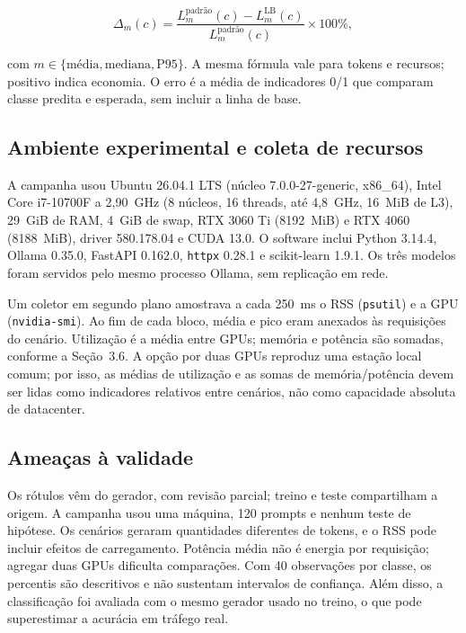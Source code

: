 \documentclass[12pt]{article}
\begin{document}
\begin{equation}
\Delta_m(c) = \frac{L^{\text{padrão}}_m(c) - L^{\text{LB}}_m(c)}{L^{\text{padrão}}_m(c)} \times 100\%,
\label{eq:delta}
\end{equation}

com $m \in \{\text{média},\text{mediana},\text{P95}\}$. A mesma fórmula vale para tokens e recursos; positivo indica economia. O erro é a média de indicadores 0/1 que comparam classe predita e esperada, sem incluir a linha de base.

\subsection{Ambiente experimental e coleta de recursos}

A campanha usou Ubuntu 26.04.1 LTS (núcleo 7.0.0-27-generic, x86\_64), Intel Core i7-10700F a 2,90~GHz (8 núcleos, 16 threads, até 4,8~GHz, 16~MiB de L3), 29~GiB de RAM, 4~GiB de swap, RTX 3060 Ti (8192~MiB) e RTX 4060 (8188~MiB), driver 580.178.04 e CUDA 13.0. O software inclui Python 3.14.4, Ollama 0.35.0, FastAPI 0.162.0, \texttt{httpx} 0.28.1 e scikit-learn 1.9.1. Os três modelos foram servidos pelo mesmo processo Ollama, sem replicação em rede.

Um coletor em segundo plano amostrava a cada 250~ms o RSS (\texttt{psutil}) e a GPU (\texttt{nvidia-smi}). Ao fim de cada bloco, média e pico eram anexados às requisições do cenário. Utilização é a média entre GPUs; memória e potência são somadas, conforme a Seção~3.6. A opção por duas GPUs reproduz uma estação local comum; por isso, as médias de utilização e as somas de memória/potência devem ser lidas como indicadores relativos entre cenários, não como capacidade absoluta de datacenter.

\subsection{Ameaças à validade}

Os rótulos vêm do gerador, com revisão parcial; treino e teste compartilham a origem. A campanha usou uma máquina, 120 prompts e nenhum teste de hipótese. Os cenários geraram quantidades diferentes de tokens, e o RSS pode incluir efeitos de carregamento. Potência média não é energia por requisição; agregar duas GPUs dificulta comparações. Com 40 observações por classe, os percentis são descritivos e não sustentam intervalos de confiança. Além disso, a classificação foi avaliada com o mesmo gerador usado no treino, o que pode superestimar a acurácia em tráfego real.
\end{document}
